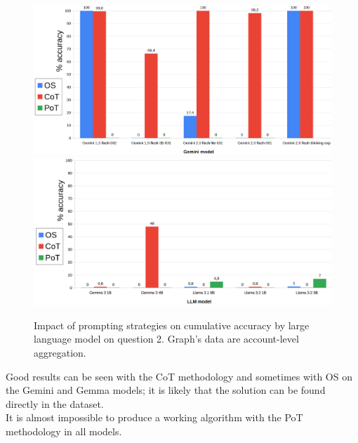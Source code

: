 \documentclass[12pt]{article}
\begin{document}
\vspace{2cm}


\begin{figure}[H]
    \centering
            \includegraphics[width=1\textwidth]{q104Gemini.png}
            \includegraphics[width=1\textwidth]{q104Other.png}
    \caption[Accuracy on Question 2 by LLM]{Impact of prompting strategies on cumulative accuracy by large language model on question 2. Graph's data are account-level aggregation.}
    \end{figure} 
Good results can be seen with the CoT methodology and sometimes with OS on the Gemini and Gemma models; it is likely that the solution can be found directly in the dataset.\\
It is almost impossible to produce a working algorithm with the PoT methodology in all models.\\

\vspace{2cm}

\end{document}
